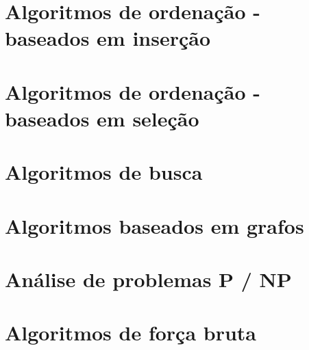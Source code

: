 	\section{Algoritmos de ordenação - baseados em inserção}
				

	\section{Algoritmos de ordenação - baseados em seleção}
		
		
	\section{Algoritmos de busca}
		
		
	\section{Algoritmos baseados em grafos}
			
		
	\section{Análise de problemas P / NP}
		
		
	\section{Algoritmos de força bruta}
		
	
	
